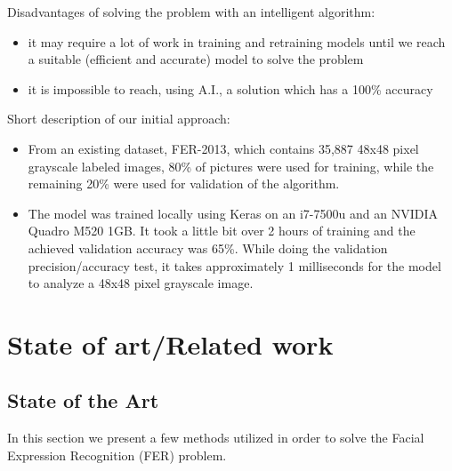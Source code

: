 \documentclass[runningheads,a4paper,11pt]{report}
\begin{document}
Disadvantages of solving the problem with an intelligent algorithm:
\begin{itemize}
	\item it may require a lot of work in training and retraining models until we reach a suitable (efficient and accurate) model to solve the problem
	\item it is impossible to reach, using A.I., a solution which has a 100\% accuracy
\end{itemize}

\pagebreak
Short description of our initial approach:
\begin{itemize}
	\item From an existing dataset, FER-2013, which contains 35,887 48x48 pixel grayscale labeled images, 80\% of pictures were used for training, while the remaining 20\% were used for validation of the algorithm.
	\item The model was trained locally using Keras on an i7-7500u and an NVIDIA Quadro M520 1GB. It took a little bit over 2 hours of training and the achieved validation accuracy was 65\%. While doing the validation precision/accuracy test, it takes approximately 1 milliseconds for the model to analyze a 48x48 pixel grayscale image.
\end{itemize}


\chapter{State of art/Related work}
\label{chapter:stateOfArt}


\section{State of the Art}
\label{section:soa}

In this section we present a few methods utilized in order to solve the Facial Expression Recognition (FER) problem.
\end{document}
